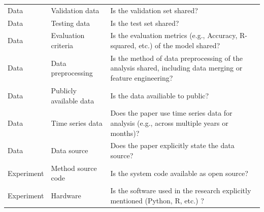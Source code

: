 \documentclass[
10pt, %
a4paper, %
oneside, %
headinclude,footinclude, %
BCOR5mm, %
]{scrartcl}
\begin{document}
\begin{table}[!htb]
\begin{tabular}{|p{1.7cm}|p{2.9cm}|p{9cm}|}
Data & Validation data & Is the validation set shared? \\
Data & Testing data & Is the test set shared? \\
Data & Evaluation criteria & Is the evaluation metrics (e.g., Accuracy, R-squared, etc.) of the model shared? \\
Data & Data preprocessing & Is the method of data preprocessing of the analysis shared, including data merging or feature engineering? \\
Data & Publicly available data &  Is the data availiable to public? \\
Data & Time series data &  Does the paper use time series data for analysis (e.g., across multiple years or months)? \\
Data & Data source & Does the paper explicitly state the data source?  \\
Experiment & Method source code & Is the system code available as open source? \\
Experiment & Hardware & Is the software used in the research explicitly mentioned (Python, R, etc.) ?\\
\hline
\end{tabular}
\end{table}
\end{document}
